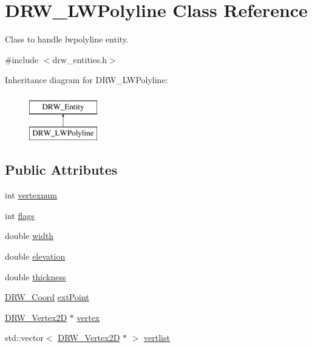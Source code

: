 \hypertarget{class_d_r_w___l_w_polyline}{}\section{D\+R\+W\+\_\+\+L\+W\+Polyline Class Reference}
\label{class_d_r_w___l_w_polyline}


Class to handle lwpolyline entity.  




{\ttfamily \#include $<$drw\+\_\+entities.\+h$>$}

Inheritance diagram for D\+R\+W\+\_\+\+L\+W\+Polyline\+:\begin{figure}[H]
\begin{center}
\leavevmode
\includegraphics[height=2.000000cm]{d8/dc8/class_d_r_w___l_w_polyline}
\end{center}
\end{figure}
\subsection*{Public Attributes}
\begin{DoxyCompactItemize}
\item 
int \hyperlink{class_d_r_w___l_w_polyline_a7aa318239f9956b6e0331199491e20a5}{vertexnum}
\item 
int \hyperlink{class_d_r_w___l_w_polyline_a66f6b406675a3c4ef540099356973510}{flags}
\item 
double \hyperlink{class_d_r_w___l_w_polyline_aedd6dd732a0b425711921104b52f8ce9}{width}
\item 
double \hyperlink{class_d_r_w___l_w_polyline_a86ba4b8badb8f008997401ec9f084a3b}{elevation}
\item 
double \hyperlink{class_d_r_w___l_w_polyline_abab38cc3e874a5c89469b382ebeb2284}{thickness}
\item 
\hyperlink{class_d_r_w___coord}{D\+R\+W\+\_\+\+Coord} \hyperlink{class_d_r_w___l_w_polyline_a859105f0a27e812dc074483809a38194}{ext\+Point}
\item 
\hyperlink{class_d_r_w___vertex2_d}{D\+R\+W\+\_\+\+Vertex2\+D} $\ast$ \hyperlink{class_d_r_w___l_w_polyline_af59a2babb12d2f8865991c39cf464538}{vertex}
\item 
std\+::vector$<$ \hyperlink{class_d_r_w___vertex2_d}{D\+R\+W\+\_\+\+Vertex2\+D} $\ast$ $>$ \hyperlink{class_d_r_w___l_w_polyline_a2da7f3449eec6588fb3765a1c9541404}{vertlist}
\end{DoxyCompactItemize}
